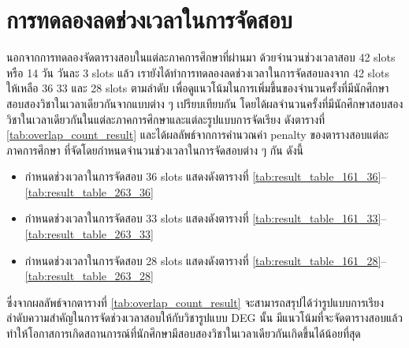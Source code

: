 \section{การทดลองลดช่วงเวลาในการจัดสอบ}
นอกจากการทดลองจัดตารางสอบในแต่ละภาคการศึกษาที่ผ่านมา ด้วยจำนวนช่วงเวลาสอบ 42 slots หรือ 14 วัน วันละ 3 slots แล้ว
เรายังได้ทำการทดลองลดช่วงเวลาในการจัดสอบลงจาก 42 slots ให้เหลือ 36 33 และ 28 slots ตามลำดับ
เพื่อดูแนวโน้มในการเพิ่มขึ้นของจำนวนครั้งที่มีนักศึกษาสอบสองวิชาในเวลาเดียวกันจากแบบต่าง ๆ เปรียบเทียบกัน
โดยได้ผลจำนวนครั้งที่มีนักศึกษาสอบสองวิชาในเวลาเดียวกันในแต่ละภาคการศึกษาและแต่ละรูปแบบการจัดเรียง ดังตารางที่ \ref{tab:overlap_count_result}
และได้ผลลัพธ์จากการคำนวณค่า penalty ของตารางสอบแต่ละภาคการศึกษา ที่จัดโดยกำหนดจำนวนช่วงเวลาในการจัดสอบต่าง ๆ กัน ดังนี้
\begin{itemize}
    \item กำหนดช่วงเวลาในการจัดสอบ 36 slots แสดงดังตารางที่ \ref{tab:result_table_161_36}--\ref{tab:result_table_263_36}
    \item กำหนดช่วงเวลาในการจัดสอบ 33 slots แสดงดังตารางที่ \ref{tab:result_table_161_33}--\ref{tab:result_table_263_33}
    \item กำหนดช่วงเวลาในการจัดสอบ 28 slots แสดงดังตารางที่ \ref{tab:result_table_161_28}--\ref{tab:result_table_263_28}
\end{itemize}
ซึ่งจากผลลัพธ์จากตารางที่ \ref{tab:overlap_count_result} จะสามารถสรุปได้ว่ารูปแบบการเรียงลำดับความสำคัญในการจัดช่วงเวลาสอบให้กับวิชารูปแบบ DEG นั้น 
มีแนวโน้มที่จะจัดตารางสอบแล้วทำให้โอกาสการเกิดสถานการณ์ที่นักศึกษามีสอบสองวิชาในเวลาเดียวกันเกิดขึ้นได้น้อยที่สุด
